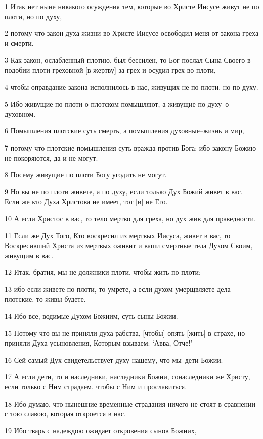 \par 1 Итак нет ныне никакого осуждения тем, которые во Христе Иисусе живут не по плоти, но по духу,
\par 2 потому что закон духа жизни во Христе Иисусе освободил меня от закона греха и смерти.
\par 3 Как закон, ослабленный плотию, был бессилен, то Бог послал Сына Своего в подобии плоти греховной [в жертву] за грех и осудил грех во плоти,
\par 4 чтобы оправдание закона исполнилось в нас, живущих не по плоти, но по духу.
\par 5 Ибо живущие по плоти о плотском помышляют, а живущие по духу--о духовном.
\par 6 Помышления плотские суть смерть, а помышления духовные--жизнь и мир,
\par 7 потому что плотские помышления суть вражда против Бога; ибо закону Божию не покоряются, да и не могут.
\par 8 Посему живущие по плоти Богу угодить не могут.
\par 9 Но вы не по плоти живете, а по духу, если только Дух Божий живет в вас. Если же кто Духа Христова не имеет, тот [и] не Его.
\par 10 А если Христос в вас, то тело мертво для греха, но дух жив для праведности.
\par 11 Если же Дух Того, Кто воскресил из мертвых Иисуса, живет в вас, то Воскресивший Христа из мертвых оживит и ваши смертные тела Духом Своим, живущим в вас.
\par 12 Итак, братия, мы не должники плоти, чтобы жить по плоти;
\par 13 ибо если живете по плоти, то умрете, а если духом умерщвляете дела плотские, то живы будете.
\par 14 Ибо все, водимые Духом Божиим, суть сыны Божии.
\par 15 Потому что вы не приняли духа рабства, [чтобы] опять [жить] в страхе, но приняли Духа усыновления, Которым взываем: `Авва, Отче!'
\par 16 Сей самый Дух свидетельствует духу нашему, что мы--дети Божии.
\par 17 А если дети, то и наследники, наследники Божии, сонаследники же Христу, если только с Ним страдаем, чтобы с Ним и прославиться.
\par 18 Ибо думаю, что нынешние временные страдания ничего не стоят в сравнении с тою славою, которая откроется в нас.
\par 19 Ибо тварь с надеждою ожидает откровения сынов Божиих,

